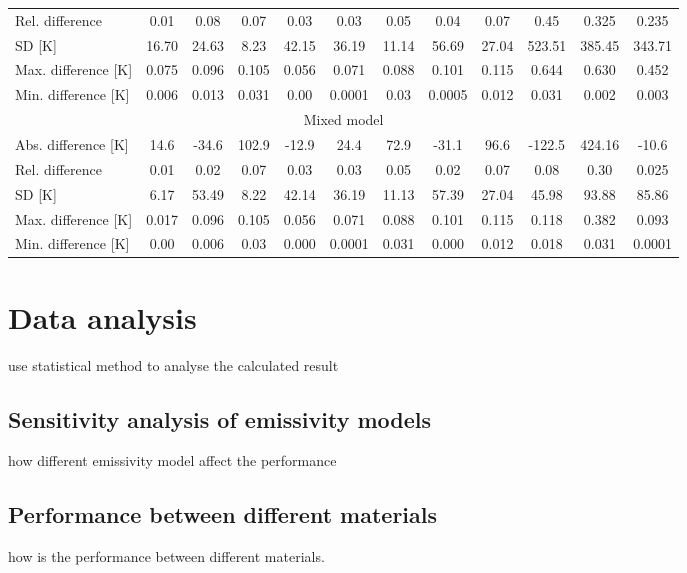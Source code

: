 \begin{table}
\begin{tabular}{lccccccccccc}
        Rel. difference         & 0.01                           & 0.08                          & 0.07    & 0.03    & 0.03    & 0.05    & 0.04    & 0.07    & 0.45    & 0.325   & 0.235    \\
        SD {[}K{]}              & 16.70                          & 24.63                         & 8.23    & 42.15   & 36.19   & 11.14   & 56.69   & 27.04   & 523.51  & 385.45  & 343.71  \\
        Max. difference {[}K{]} & 0.075                          & 0.096                         & 0.105   & 0.056   & 0.071   & 0.088   & 0.101   & 0.115   & 0.644   & 0.630   & 0.452   \\
        Min. difference {[}K{]} & 0.006                          & 0.013                         & 0.031   & 0.00    & 0.0001  & 0.03    & 0.0005  & 0.012   & 0.031   & 0.002   & 0.003   \\ \hline
        \multicolumn{12}{c}{Mixed model}                                                                                                                                                   \\ \hline
        Abs. difference {[}K{]} & 14.6                           & -34.6                         & 102.9   & -12.9   & 24.4    & 72.9    & -31.1   & 96.6    & -122.5  & 424.16  & -10.6    \\
        Rel. difference         & 0.01                           & 0.02                          & 0.07    & 0.03    & 0.03    & 0.05    & 0.02    & 0.07    & 0.08    & 0.30    & 0.025    \\
        SD {[}K{]}              & 6.17                           & 53.49                         & 8.22    & 42.14   & 36.19   & 11.13   & 57.39   & 27.04   & 45.98   & 93.88   & 85.86  \\
        Max. difference {[}K{]} & 0.017                          & 0.096                         & 0.105   & 0.056   & 0.071   & 0.088   & 0.101   & 0.115   & 0.118   & 0.382   & 0.093   \\
        Min. difference {[}K{]} & 0.00                           & 0.006                         & 0.03    & 0.000   & 0.0001  & 0.031   & 0.000   & 0.012   & 0.018   & 0.031   & 0.0001  
    \end{tabular}
\end{table}


\section{Data analysis}
use statistical method to analyse the calculated result
\subsection{Sensitivity analysis of emissivity models}
how different emissivity model affect the performance 
\subsection{Performance between different materials}
how is the performance between different materials.